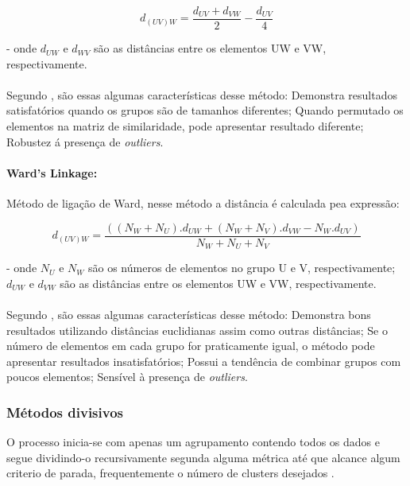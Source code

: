 \begin{equation}\label{eq:median_lkg}
d_{(UV)W} = \frac{d_{UV} + d_{VW}}{2} - \frac{d_{UV}}{4}
\end{equation}

- onde  $d_{UW}$ e $d_{WV}$ são as distâncias entre os elementos UW e VW, respectivamente. 

\paragraph{}
Segundo \cite{Doni:2004}, são essas algumas características desse método: Demonstra resultados satisfatórios quando os grupos são de tamanhos diferentes; Quando permutado os elementos na matriz de similaridade, pode apresentar resultado diferente; Robustez á presença de \textit{outliers}.

\paragraph{Ward's Linkage:}

Método de ligação de Ward, nesse método a distância é calculada pea expressão:

\begin{equation}\label{eq:ward_lkg}
d_{(UV)W} = \frac{((N_{W}+N_{U}).d_{UW} + (N_{W}+N_{V}).d_{VW} - N_{W}.d_{UV})}{N_{W}+N_{U}+N_{V}}
\end{equation}

- onde $N_{U}$ e $N_{W}$ são os números de elementos no grupo U e V, respectivamente; $d_{UW}$ e $d_{VW}$ são as distâncias entre os elementos UW e VW, respectivamente.

\paragraph{}
Segundo \cite{Doni:2004}, são essas algumas características desse método: Demonstra bons resultados utilizando distâncias euclidianas assim como outras distâncias; Se o número de elementos em cada grupo for praticamente igual, o método pode apresentar resultados insatisfatórios; Possui a tendência de combinar grupos com poucos elementos; Sensível à presença de \textit{outliers}.

\subsubsection{Métodos divisivos}

O processo inicia-se com apenas um agrupamento contendo todos os dados e segue dividindo-o recursivamente segunda alguma métrica até que alcance algum criterio de parada, frequentemente o número de clusters desejados \cite{berkhin2004survey}. 

